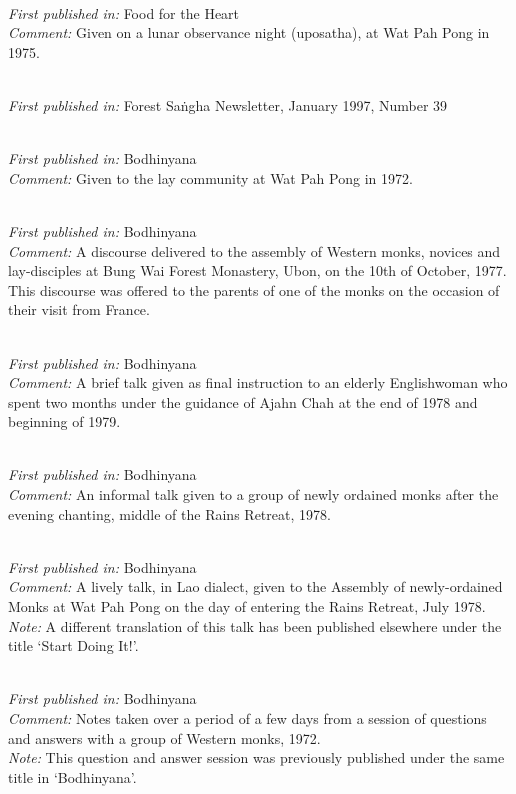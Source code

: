 \\
\textit{First published in:} Food for the Heart \\
\textit{Comment:} Given on a lunar observance night (uposatha), at Wat Pah Pong in 1975.

 \\
\textit{First published in:} Forest Sa\.ngha Newsletter, January 1997, Number 39

 \\
\textit{First published in:} Bodhinyana \\
\textit{Comment:} Given to the lay community at Wat Pah Pong in 1972.

 \\
\textit{First published in:} Bodhinyana \\
\textit{Comment:} A discourse delivered to the assembly of Western monks, novices and lay-disciples at Bung Wai Forest Monastery, Ubon, on the 10th of October, 1977. This discourse was offered to the parents of one of the monks on the occasion of their visit from France.

\clearpage

 \\
\textit{First published in:} Bodhinyana \\
\textit{Comment:} A brief talk given as final instruction to an elderly Englishwoman who spent two months under the guidance of Ajahn Chah at the end of 1978 and beginning of 1979.

 \\
\textit{First published in:} Bodhinyana \\
\textit{Comment:} An informal talk given to a group of newly ordained monks after the evening chanting, middle of the Rains Retreat, 1978.

 \\
\textit{First published in:} Bodhinyana \\
\textit{Comment:} A lively talk, in Lao dialect, given to the Assembly of newly-ordained Monks at Wat Pah Pong on the day of entering the Rains Retreat, July 1978. \\
\textit{Note:} A different translation of this talk has been published elsewhere under the title `Start Doing It!'.

 \\
\textit{First published in:} Bodhinyana \\
\textit{Comment:} Notes taken over a period of a few days from a session of questions and answers with a group of Western monks, 1972. \\
\textit{Note:} This question and answer session was previously published under the same title in `Bodhinyana'.

